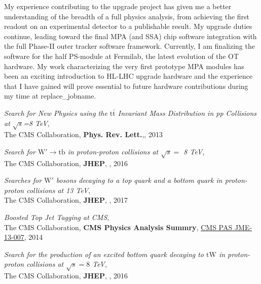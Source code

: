 \documentclass[12pt]{article}
\begin{document}
My experience contributing to the upgrade
project has given me a better understanding of the breadth of a full physics analysis,
from achieving the first readout on an experimental detector to a publishable result.
My upgrade duties continue, leading toward the final MPA (and SSA) chip software integration
with the full Phase-II outer tracker software framework.
Currently, I am finalizing the software for the half PS-module at Fermilab,
the latest evolution of the OT hardware.
My work characterizing
the very first prototype MPA modules has been an exciting introduction to HL-LHC
upgrade hardware and the experience that I have gained will prove essential to
future hardware contributions during my time at replace_jobname.
\normalem

\begin{flushleft}
\begin{thebibliography}{1}


  \textit{Search for New Physics using the $\mathrm{t\bar{t}}$ Invariant Mass Distribution in pp Collisions at $\sqrt{s}$=8  TeV},\\
 The CMS Collaboration, \textbf{Phys. Rev. Lett.},{}, 2013

  \textit{Search for $\mathrm{W' \to tb}$ in proton-proton collisions at $\sqrt{s} = $ 8 TeV},\\
 The CMS Collaboration, \textbf{JHEP}, , 2016

  \textit{Searches for $\mathrm{W'}$ bosons decaying to a top quark and a bottom quark in proton-proton collisions at 13 TeV}, \\
  The CMS Collaboration, \textbf{JHEP}, , 2017



 \textit{Boosted Top Jet Tagging at CMS},\\
 The CMS Collaboration, \textbf{CMS Physics Analysis Summry}, \href{http://cms-physics.web.cern.ch/cms-physics/public/JME-13-007-pas.pdf}{{\color{blue}\underline{CMS PAS JME-13-007}}}, 2014


  \textit{Search for the production of an excited bottom quark decaying to $\mathrm{tW}$ in proton-proton collisions at $ \sqrt{s}=8 $ TeV},\\
The CMS Collaboration, \textbf{JHEP}, , 2016




\end{thebibliography}
\end{flushleft}
\end{document}
